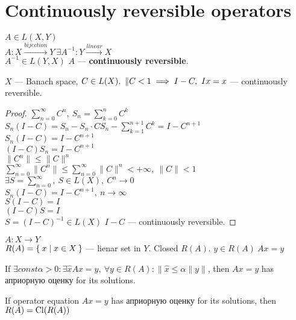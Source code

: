 \section{Continuously reversible operators}
\begin{defn}
  $A \in L(X, Y)$ \\
  $A \colon X \xrightarrow{bijection} Y\ \exists A^{-1} \colon Y
  \xrightarrow{linear} X$ \\
  $A^{-1} \in L(Y, X)$ $A$ --- \textbf{continuously reversible}.
\end{defn}

\begin{thm}[Banach]
  $X$ --- Banach space, $C \in L(X),\ \|C\\ < 1 \implies I - C,\ Ix = x$ --- continuously reversible.
\end{thm}
\begin{proof}
  $\sum\limits_{n = 0}^\infty C^n,\ S_n = \sum\limits_{k = 0}^n C^k$\\
  $S_n(I - C) = S_n - S_n \cdot C S_n - \sum\limits_{k = 1}^{n + 1}C^k = I -
  C^{n + 1}$ \\
  $S_n(I - C) = I - C^{n + 1}$ \\
  $(I - C)S_n = I - C^{n + 1}$ \\
  $\|C^n\| \leq \|C\|^n$ \\
  $\sum\limits_{n = 0}^\infty\|C^n\| \leq \sum\limits_{n = 0}^\infty \|C\|^n < +
  \infty,\ \|C\| < 1$ \\
  $\exists S = \sum\limits_{n = 0}^\infty,\ S \in L(X),\ C^n \to 0$ \\
  $S_n(I - C) = I - C^{n + 1},\ n \to \infty$ \\
  $S(I - C) = I$ \\
  $(I - C)S = I$ \\
  $S = (I - C)^{-1} \in L(X)$
  $I - C$ --- continuously reversible.
\end{proof}

$A \colon X \to Y$ \\
$R(A) = \Set{x | x \in X}$ --- lienar set in $Y$.
Closed $R(A)$.
$y \in R(A)\ Ax = y$

\begin{defn}
  If $\exists const \alpha > 0 : \exists \hat{x} Ax = y,\ \forall y \in R(A) :
  \|\hat{x} \leq \alpha \|y\|$, then $Ax = y$ has априорную оценку for its solutions.
\end{defn}

\begin{thm}
  If operator equation $Ax = y$ has априорную оценку for its solutions, then
  $R(A) = \operatorname{Cl}({R(A)})$
\end{thm}
